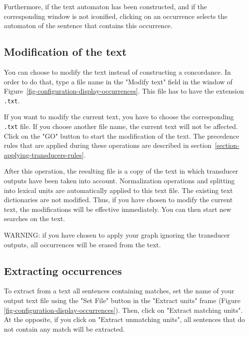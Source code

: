 \noindent Furthermore, if the text automaton has been constructed, and if the
corresponding window is not iconified, clicking on an occurrence selects the automaton of the
sentence that contains this occurrence.

\subsection{Modification of the text}
\label{section-modifying-text}
You can choose to modify the text instead of constructing a concordance. In order
to do that, type a file name in the "Modify text" field in the window of
Figure~\ref{fig-configuration-display-occurrences}. This file has to have the
extension \verb+.txt+.

\bigskip
\noindent If you want to modify the current text, you have to choose the
corresponding \verb+.txt+ file. If you choose another file name, the current text will not be
affected. Click on the  "GO" button to start the modification of the text. The
precedence rules that are applied during these operations are described in
section~\ref{section-applying-transducers-rules}.

\bigskip
\noindent After this operation, the resulting file is a copy of the text
in which transducer outputs have been taken into account. Normalization
operations and splitting into lexical units are automatically applied to
this text file. The existing text dictionaries are not modified. Thus, if you
have chosen to modify the current text, the modifications will be effective
immediately. You can then start new searches on the text.

\bigskip
\noindent WARNING: if you have chosen to apply your graph ignoring the
transducer outputs, all occurrences will be erased from the text.




\subsection{Extracting occurrences}
To extract from a text all sentences containing matches, set the name of your
output text file using the "Set File" button in the "Extract units" frame (Figure
\ref{fig-configuration-display-occurrences}). Then, click on "Extract matching
units". At the opposite, if you click on "Extract unmatching units", all
sentences that do not contain any match will be extracted.



